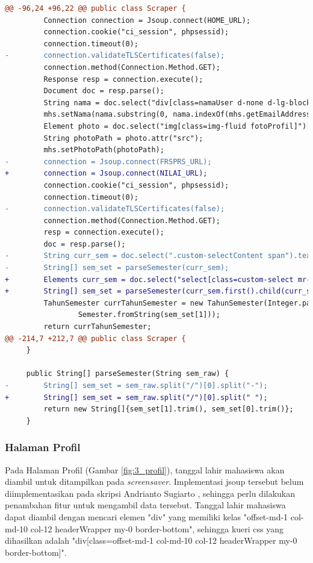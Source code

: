 \begin{lstlisting}[language=diff, caption=Perubahan Implementasi Jsoup Halaman Utama, label=diff_halaman_utama]
@@ -96,24 +96,22 @@ public class Scraper {
         Connection connection = Jsoup.connect(HOME_URL);
         connection.cookie("ci_session", phpsessid);
         connection.timeout(0);
-        connection.validateTLSCertificates(false);
         connection.method(Connection.Method.GET);
         Response resp = connection.execute();
         Document doc = resp.parse();
         String nama = doc.select("div[class=namaUser d-none d-lg-block mr-3]").text();
         mhs.setNama(nama.substring(0, nama.indexOf(mhs.getEmailAddress())));
         Element photo = doc.select("img[class=img-fluid fotoProfil]").first();
         String photoPath = photo.attr("src");
         mhs.setPhotoPath(photoPath);
-        connection = Jsoup.connect(FRSPRS_URL);
+        connection = Jsoup.connect(NILAI_URL);
         connection.cookie("ci_session", phpsessid);
         connection.timeout(0);
-        connection.validateTLSCertificates(false);
         connection.method(Connection.Method.GET);
         resp = connection.execute();
         doc = resp.parse();
-        String curr_sem = doc.select(".custom-selectContent span").text();
-        String[] sem_set = parseSemester(curr_sem);
+        Elements curr_sem = doc.select("select[class=custom-select mr-3]");
+        String[] sem_set = parseSemester(curr_sem.first().child(curr_sem.first().childrenSize() - 1).text());
         TahunSemester currTahunSemester = new TahunSemester(Integer.parseInt(sem_set[0]),
                 Semester.fromString(sem_set[1]));
         return currTahunSemester;
@@ -214,7 +212,7 @@ public class Scraper {
     }

     public String[] parseSemester(String sem_raw) {
-        String[] sem_set = sem_raw.split("/")[0].split("-");
+        String[] sem_set = sem_raw.split("/")[0].split(" ");
         return new String[]{sem_set[1].trim(), sem_set[0].trim()};
     }
\end{lstlisting}

\subsubsection{Halaman Profil}
Pada Halaman Profil (Gambar \ref{fig:3_profil}), tanggal lahir mahasiswa akan diambil untuk ditampilkan pada \textit{screensaver}. Implementasi jsoup tersebut belum diimplementasikan pada skripsi Andrianto Sugiarto \cite{ifstupor}, sehingga perlu dilakukan penambahan fitur untuk mengambil data tersebut. Tanggal lahir mahasiswa dapat diambil dengan mencari elemen "div" yang memiliki kelas "offset-md-1 col-md-10 col-12 headerWrapper my-0 border-bottom", sehingga kueri css yang dihasilkan adalah "div[class=offset-md-1 col-md-10 col-12 headerWrapper my-0 border-bottom]".


